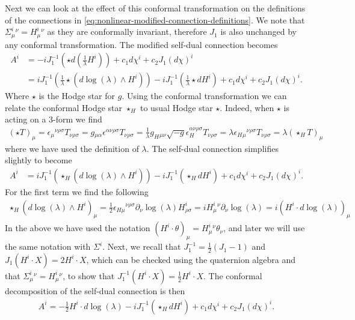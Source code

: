 \documentclass[10pt]{report}
\theoremstyle{definition}
\begin{document}
        Next we can look at the effect of this conformal transformation on the definitions of the connections in \cref{eq:nonlinear-modified-connection-definitions}. We note that $\Sigma^i_\mu{}^\nu = H^i_\mu{}^\nu$ as they are conformally invariant, therefore $J_1$ is also unchanged by any conformal transformation. The modified self-dual connection becomes 
        \begin{align}
            A^i & = -i J_1^{-1}\left( \star d\left(\frac{1}{\lambda} H^i\right) \right) + c_1 d\chi^i + c_2 J_1(d\chi)^i \\ 
                & = i J_1^{-1}\left( \frac{1}{\lambda} \star \left( d\log(\lambda) \wedge H^i \right) \right) -i J_1^{-1} \left( \frac{1}{\lambda} \star dH^i \right) + c_1 d\chi^i + c_2 J_1(d\chi)^i.
        \end{align}
        Where $\star$ is the Hodge star for $g$. Using the conformal transformation we can relate the conformal Hodge star $\star_H$ to usual Hodge star $\star$. Indeed, when $\star$ is acting on a 3-form we find 
        \begin{align}
            (\star T)_\mu = \epsilon{}_\mu{}^{\nu\rho\sigma} T_{\nu\rho\sigma} = g{}_{\mu\alpha} \epsilon^{\alpha\nu\rho\sigma} T_{\nu\rho\sigma} = \frac{1}{\lambda} g_H{}_{\mu\nu} \sqrt{-g}\epsilon^{\alpha\nu\rho\sigma}_H T_{\nu\rho\sigma} = \lambda \epsilon_H{}_\mu{}^{\nu\rho\sigma} T_{\nu\rho\sigma} = \lambda (\star_H T)_\mu
        \end{align}
        where we have used the definition of $\lambda$. The self-dual connection simplifies slightly to become 
        \begin{align}
            A^i & = i J_1^{-1}\left( \star_H \left( d\log(\lambda) \wedge H^i \right) \right) -i J_1^{-1} \left( \star_H dH^i \right) + c_1 d\chi^i + c_2 J_1(d\chi)^i.
        \end{align}
        For the first term we find the following 
        \begin{align}
            \star_H (d\log(\lambda) \wedge H^i)_\mu = \frac{1}{2} \epsilon_{H\mu}{}^{\nu\rho\sigma} \partial_\nu \log(\lambda) H^i_{\rho\sigma} = i H^i_\mu{}^\nu \partial_\nu \log(\lambda) = i (H^i \cdot d \log(\lambda))_\mu
        \end{align}
        In the above we have used the notation $(H^i \cdot \theta)_\mu = H^i_\mu{}^\nu \theta_\nu$, and later we will use the same notation with $\Sigma^i$.  Next, we recall that $J_1^{-1} = \frac{1}{2}(J_1 - 1)$ and $J_1( H^i \cdot X ) = 2 H^i \cdot X$, which can be checked using the quaternion algebra and that $\Sigma^i_\mu{}^\nu = H^i_\mu{}^\nu$, to show that $J_1^{-1}(H^i \cdot X) = \frac{1}{2} H^i \cdot X$. The conformal decomposition of the self-dual connection is then
        \begin{align}
            A^i = -\frac{1}{2} H^i \cdot d\log(\lambda) -i J_1^{-1}( \star_H d H^i) + c_1 d\chi^i + c_2 J_1(d\chi)^i.
        \end{align}
\end{document}
